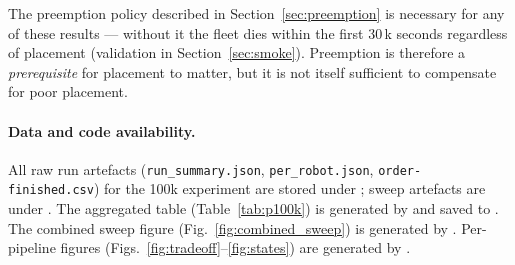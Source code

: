 The preemption policy described in Section~\ref{sec:preemption} is
necessary for any of these results --- without it the fleet dies
within the first 30\,k seconds regardless of placement (validation
in Section~\ref{sec:smoke}). Preemption is therefore a
\emph{prerequisite} for placement to matter, but it is not itself
sufficient to compensate for poor placement.


\paragraph{Data and code availability.}
All raw run artefacts (\texttt{run\_summary.json},
\texttt{per\_robot.json}, \texttt{order-finished.csv}) for the
100k experiment are stored under
; sweep artefacts are under
. The aggregated table
(Table~\ref{tab:p100k}) is generated by
 and saved to
. The combined sweep figure
(Fig.~\ref{fig:combined_sweep}) is generated by
. Per-pipeline figures
(Figs.~\ref{fig:tradeoff}--\ref{fig:states}) are generated by
.
